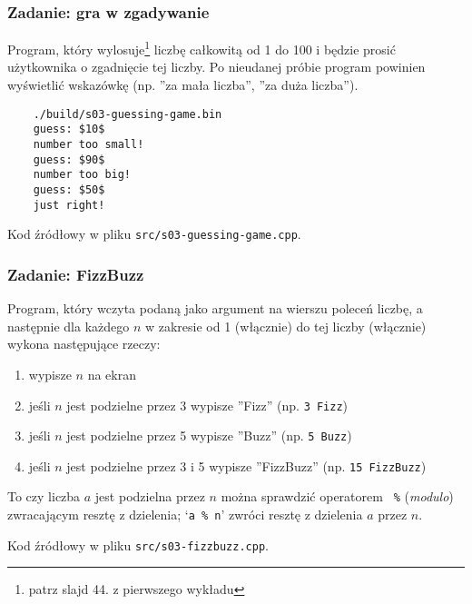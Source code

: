 \documentclass[aspectratio=169]{beamer}
\begin{document}
\begin{frame}[fragile]
    \frametitle{Zadanie: gra w zgadywanie}
    \label{lecture_exercise_2}

    Program, który wylosuje\footnote{patrz slajd 44. z pierwszego wykładu}
    liczbę całkowitą od 1 do 100 i będzie prosić użytkownika o zgadnięcie tej
    liczby. Po nieudanej próbie program powinien wyświetlić wskazówkę (np. ''za
    mała liczba'', ''za duża liczba'').

    \begin{lstlisting}
    ./build/s03-guessing-game.bin
    guess: $10$
    number too small!
    guess: $90$
    number too big!
    guess: $50$
    just right!
    \end{lstlisting}

    Kod źródłowy w pliku {\tt src/s03-guessing-game.cpp}.
\end{frame}

\begin{frame}[fragile]
    \frametitle{Zadanie: FizzBuzz}
    \label{lecture_exercise_3}

    Program, który wczyta podaną jako argument na wierszu poleceń liczbę, a
    następnie dla każdego $n$ w zakresie od 1 (włącznie) do tej liczby
    (włącznie) wykona następujące rzeczy:

    \begin{enumerate}
        \item wypisze $n$ na ekran
        \item jeśli $n$ jest podzielne przez 3 wypisze ''Fizz'' (np. {\tt 3
            Fizz})
        \item jeśli $n$ jest podzielne przez 5 wypisze ''Buzz'' (np. {\tt 5
            Buzz})
        \item jeśli $n$ jest podzielne przez 3 i 5 wypisze ''FizzBuzz'' (np.
            {\tt 15 FizzBuzz})
    \end{enumerate}

    To czy liczba $a$ jest podzielna przez $n$ można sprawdzić operatorem {\tt
    \%} (\emph{modulo}) zwracającym resztę z dzielenia; `{\tt a \% n}' zwróci
    resztę z dzielenia $a$ przez $n$.

    Kod źródłowy w pliku {\tt src/s03-fizzbuzz.cpp}.
\end{frame}
\end{document}
